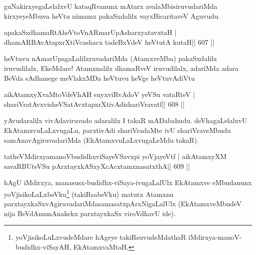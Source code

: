 \begin{artha}
guNakirxyegaLelalxvU kataqRvanunx mAtarx avalaMbisiruvudariMda kirxyeyeMbuva heVtu nimamx pakaSxdalilx vayxBicaritaveV Aguvudu.
\end{artha}



\begin{shl}
apakaSxdhamaRtA\footnotemark[4] heVtoVnARmarUpAsharxyatavxtaH |
dhamARBAvAtapxrXtiVcashacx tadeBxVdeV heVtutA kutaH\hfill || 607 ||
\end{shl}

\begin{artha}
heVtuvu nAmarUpagaLalilxruvadariMda (AtamxveMba) pakaSxdalilx
iruvudilalx, EkeMdare! Atamxnalilx dhamaRveV iruvudilalx, adariMda
adara BeVda sAdhanege meVlakxMDa heVtuvu heVge heVtuvAdiVtu
\end{artha}

\begin{shl}
aikAtamxyXvaMtoV\footnotemark[1] deVhAH suyxviRvAdoV yeVSu vataRteV |
shariVratAvxvisheVSatAvxtapxrXtivAdishariVravatf\hfill || 608 ||
\end{shl}

\begin{artha}
yAvudaralilx vivAdaviruvado adaralilx I takaR mADabahudu. deVhagaLelalxvU EkAtamxvuLaLxvugaLu, parxtivAdi shariVradaMte ivU shariVraveMbudu samAnavAgiruvadariMda (EkAtamxvuLaLxvugaLeMdu takaR).
\end{artha}

\begin{shl}
tatheVMdirxyamanoVbudidhxviSayeVSavxpi yoVjayeVtf |
aikAtamxyXM savaRBUteVSu pArxtayxkASxyXcAcx\s\s tamxnasatxthA\hfill || 609 ||
\end{shl}

\begin{artha}
hAgU iMdirxya, manasusx-budidhx-viSaya-ivugaLalUlx EkAtamxve eMbudanunx yoVjisikoLaLxbeVku\footnote[2]{yoVjisikoLuLxvudeMdare hAgeye   takiRsuvudeMdathaR iMdirxya-manoV-budidhx-viSayAH, EkAtamxvaMtaH,} (takiRsabeVku) matutx Atamxnu parxtayxkaSxvAgiruvadariMda\footnotemark[2] samasatx\footnotemark[1]pArxNigaLalUlx (EkAtamxveMbudeV nija  BeVdAnumAnakekx parxtayxkaSx viroVdhavU ide).
\end{artha}

